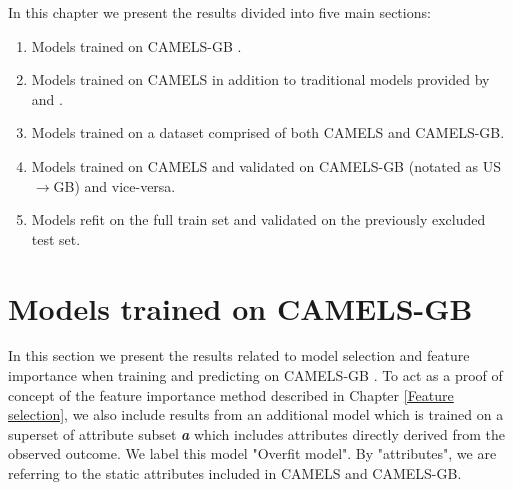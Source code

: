 In this chapter we present the results divided into five main sections:
\begin{enumerate}
    \item Models trained on CAMELS-GB \citep{CAMELS_GB}.
    \item Models trained on CAMELS \citep{CAMELS_US} in addition to traditional 
        models provided by \citet{CAMELS_hydroshare} and \citet{NWMbench}.
    \item Models trained on a dataset comprised of both CAMELS and CAMELS-GB.
    \item Models trained on CAMELS and validated on CAMELS-GB (notated as US$\rightarrow$GB) 
        and vice-versa.
    \item Models refit on the full train set and validated on the previously excluded 
        test set.
\end{enumerate}
\section{Models trained on CAMELS-GB}
\label{CAMELS-GB results}
In this section we present the results related to model selection and feature 
importance when training and predicting on CAMELS-GB \citep{CAMELS_GB}. To act 
as a proof of concept of the feature importance method described in Chapter 
\ref{Feature selection}, we also include results from an additional model which
is trained on a superset of attribute subset \textbf{\textit{a}} which includes 
attributes directly derived from the observed outcome. We label this model "Overfit model". 
By "attributes", we are referring to the static attributes included in CAMELS and 
CAMELS-GB.

